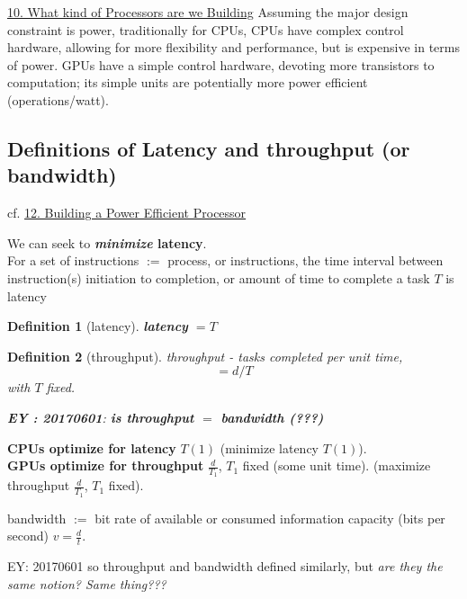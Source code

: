 \documentclass[10pt]{amsart}
\newtheorem{definition}{Definition}
\begin{document}
\begin{multicols*}{2}
\href{https://classroom.udacity.com/courses/cs344/lessons/55120467/concepts/668323280923}{10. What kind of Processors are we Building} Assuming the major design constraint is power, traditionally for CPUs, CPUs have complex control hardware, allowing for more flexibility and performance, but is expensive in terms of power.  GPUs have a simple control hardware, devoting more transistors to computation; its simple units are potentially more power efficient (operations/watt).  

\subsection{Definitions of Latency and throughput (or bandwidth)}

cf. 
\href{https://classroom.udacity.com/courses/cs344/lessons/55120467/concepts/669874580923}{12. Building a Power Efficient Processor}

We can seek to \textbf{\emph{minimize} latency}.   \\

For a set of instructions $:= $ process, or instructions, the time interval between instruction(s) initiation to completion, or amount of time to complete a task $T$ is latency
\begin{definition}[latency]
\textbf{latency} $ = T$
\end{definition}

\begin{definition}[throughput]
throughput - tasks completed per unit time, 
\begin{equation}
= d/T 
\end{equation}
with $T$ fixed.  

\textbf{EY : 20170601}: \textbf{ is throughput $=$ bandwidth (???) }
\end{definition}

\textbf{CPUs optimize for latency} $T(1)$ (minimize latency $T(1)$).   \\

\textbf{GPUs optimize for throughput} $\frac{d}{T_1}$, $T_1$ fixed (some unit time).  (maximize throughput $\frac{d}{T_1}$, $T_1$ fixed).  

bandwidth $:=$ bit rate of available or consumed information capacity (bits per second) $v=\frac{d}{t}$.  

EY: 20170601 so throughput and bandwidth defined similarly, but \emph{are they the same notion?  Same thing???}






\end{multicols*}
\end{document}
